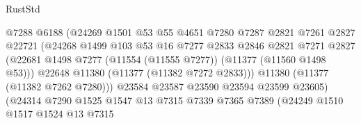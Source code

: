 \begin{lexlean}{RustStd}
\begin{coremodule}
                                      @7288
                                      @6188
                                      (@24269
                                        @1501
                                        @53
                                        @55
                                        @4651
                                        @7280
                                        @7287
                                        @2821
                                        @7261
                                        @2827
                                        @22721
                                        (@24268
                                          @1499
                                          @103
                                          @53
                                          @16
                                          @7277
                                          @2833
                                          @2846
                                          @2821
                                          @7271
                                          @2827
                                          (@22681
                                            @1498
                                            @7277
                                            (@11554 (@11555 @7277))
                                            (@11377 (@11560 @1498 @53)))
                                          @22648
                                          @11380
                                          (@11377 (@11382 @7272 @2833)))
                                        @11380
                                        (@11377 (@11382 @7262 @7280)))
                                      @23584
                                      @23587
                                      @23590
                                      @23594
                                      @23599
                                      @23605)
                                    (@24314
                                      @7290
                                      @1525
                                      @1547
                                      @13
                                      @7315
                                      @7339
                                      @7365
                                      @7389
                                      (@24249
                                        @1510
                                        @1517
                                        @1524
                                        @13
                                        @7315

\end{coremodule}
\end{lexlean}
